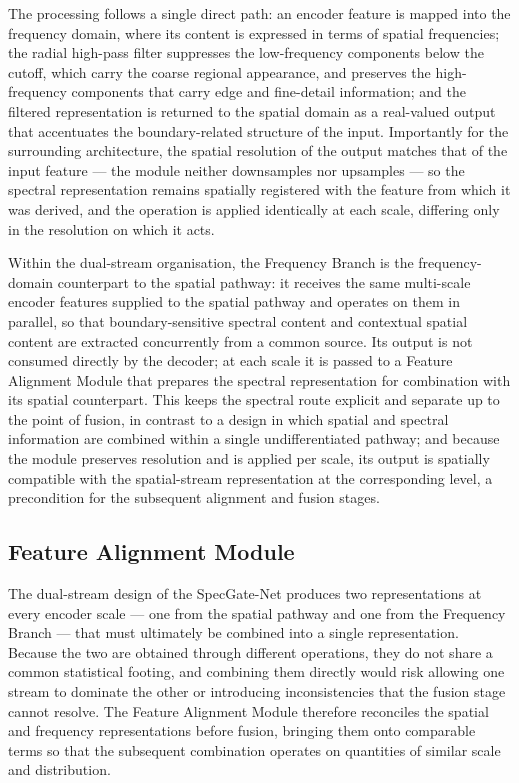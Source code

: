 The processing follows a single direct path: an encoder feature is mapped into the frequency domain, where its content is expressed in terms of spatial frequencies; the radial high-pass filter suppresses the low-frequency components below the cutoff, which carry the coarse regional appearance, and preserves the high-frequency components that carry edge and fine-detail information; and the filtered representation is returned to the spatial domain as a real-valued output that accentuates the boundary-related structure of the input. Importantly for the surrounding architecture, the spatial resolution of the output matches that of the input feature --- the module neither downsamples nor upsamples --- so the spectral representation remains spatially registered with the feature from which it was derived, and the operation is applied identically at each scale, differing only in the resolution on which it acts.

Within the dual-stream organisation, the Frequency Branch is the frequency-domain counterpart to the spatial pathway: it receives the same multi-scale encoder features supplied to the spatial pathway and operates on them in parallel, so that boundary-sensitive spectral content and contextual spatial content are extracted concurrently from a common source. Its output is not consumed directly by the decoder; at each scale it is passed to a Feature Alignment Module that prepares the spectral representation for combination with its spatial counterpart. This keeps the spectral route explicit and separate up to the point of fusion, in contrast to a design in which spatial and spectral information are combined within a single undifferentiated pathway; and because the module preserves resolution and is applied per scale, its output is spatially compatible with the spatial-stream representation at the corresponding level, a precondition for the subsequent alignment and fusion stages.

\subsection{Feature Alignment Module}

The dual-stream design of the SpecGate-Net produces two representations at every encoder scale --- one from the spatial pathway and one from the Frequency Branch --- that must ultimately be combined into a single representation. Because the two are obtained through different operations, they do not share a common statistical footing, and combining them directly would risk allowing one stream to dominate the other or introducing inconsistencies that the fusion stage cannot resolve. The Feature Alignment Module therefore reconciles the spatial and frequency representations before fusion, bringing them onto comparable terms so that the subsequent combination operates on quantities of similar scale and distribution.

